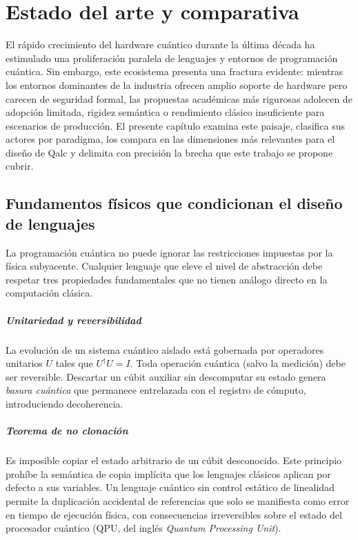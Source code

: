 \chapter{Estado del arte y comparativa}

El rápido crecimiento del hardware cuántico durante la última década ha estimulado una proliferación paralela de lenguajes y entornos de programación cuántica. Sin embargo, este ecosistema presenta una fractura evidente: mientras los entornos dominantes de la industria ofrecen amplio soporte de hardware pero carecen de seguridad formal, las propuestas académicas más rigurosas adolecen de adopción limitada, rigidez semántica o rendimiento clásico insuficiente para escenarios de producción. El presente capítulo examina este paisaje, clasifica sus actores por paradigma, los compara en las dimensiones más relevantes para el diseño de Qalc y delimita con precisión la brecha que este trabajo se propone cubrir.

\section{Fundamentos físicos que condicionan el diseño de lenguajes}

La programación cuántica no puede ignorar las restricciones impuestas por la física subyacente. Cualquier lenguaje que eleve el nivel de abstracción debe respetar tres propiedades fundamentales que no tienen análogo directo en la computación clásica.

\paragraph{Unitariedad y reversibilidad}
La evolución de un sistema cuántico aislado está gobernada por operadores unitarios $U$ tales que $U^\dagger U = I$. Toda operación cuántica (salvo la medición) debe ser reversible. Descartar un cúbit auxiliar sin descomputar su estado genera \textit{basura cuántica} que permanece entrelazada con el registro de cómputo, introduciendo decoherencia.

\paragraph{Teorema de no clonación}
Es imposible copiar el estado arbitrario de un cúbit desconocido. Este principio prohíbe la semántica de copia implícita que los lenguajes clásicos aplican por defecto a sus variables. Un lenguaje cuántico sin control estático de linealidad permite la duplicación accidental de referencias que solo se manifiesta como error en tiempo de ejecución física, con consecuencias irreversibles sobre el estado del procesador cuántico (QPU, del inglés \textit{Quantum Processing Unit}).

